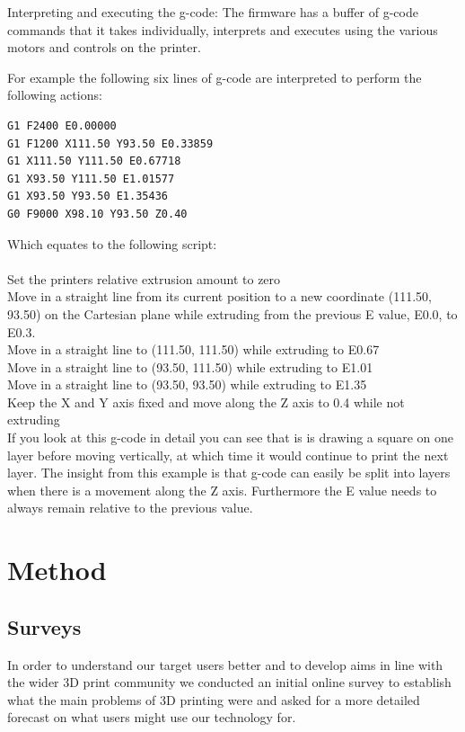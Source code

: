 \documentclass[pdftex, 11pt]{report} %
\begin{document}
Interpreting and executing the g-code: The firmware has a buffer of g-code commands that it takes individually, interprets and executes using the various motors and controls on the printer. 

For example the following six lines of g-code are interpreted to perform the following actions:
\begin{verbatim}
G1 F2400 E0.00000
G1 F1200 X111.50 Y93.50 E0.33859
G1 X111.50 Y111.50 E0.67718
G1 X93.50 Y111.50 E1.01577
G1 X93.50 Y93.50 E1.35436
G0 F9000 X98.10 Y93.50 Z0.40
\end{verbatim}

Which equates to the following script:\\
\\
Set the printers relative extrusion amount to zero\\
Move in a straight line from its current position to a new coordinate (111.50, 93.50) on the Cartesian plane while extruding from the previous E value, E0.0,  to E0.3.\\
Move in a straight line to (111.50, 111.50) while extruding to E0.67\\
Move in a straight line to (93.50, 111.50) while extruding to E1.01\\
Move in a straight line to (93.50, 93.50) while extruding to E1.35\\
Keep the X and Y axis fixed and move along the Z axis to 0.4 while not extruding\\

If you look at this g-code in detail you can see that is is drawing a square on one layer before moving vertically, at which time it would continue to print the next layer. The insight from this example is that g-code can easily be split into layers when there is a movement along the Z axis. Furthermore the E value needs to always remain relative to the previous value. 




\chapter{Method}
\label{section:Method}
\section{Surveys}
In order to understand our target users better and to develop aims in line with the wider 3D print community we conducted an initial online survey to establish what the main problems of 3D printing were and asked for a more detailed forecast on what users might use our technology for. 
\end{document}
